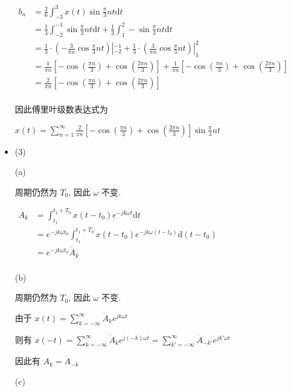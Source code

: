 \documentclass[a4paper,UTF8]{article}
\numberwithin{equation}{section}
\begin{document}
\begin{framed}
\begin{spacing}{1.5}
\begin{itemize}
      $
      \begin{aligned}
      b_n & = \frac{2}{6}\int_{-3}^{3}x(t)\sin \frac{\pi}{3}nt \mathrm{d}t  \\
      & = \frac{1}{3}\int_{-2}^{-1}\sin \frac{\pi}{3}nt \mathrm{d}t + \frac{1}{3}\int_{1}^{2}-\sin \frac{\pi}{3}nt \mathrm{d}t  \\
      & = \frac{1}{3}\cdot (-\frac{3}{\pi n}\cos \frac{\pi}{3}nt)|_{-2}^{-1} + \frac{1}{3}\cdot (\frac{3}{\pi n}\cos \frac{\pi}{3}nt)|_{1}^{2}  \\
      & = \frac{1}{\pi n}[- \cos{(\frac{\pi n}{3})} + \cos{(\frac{2 \pi n}{3})}] + \frac{1}{\pi n}[- \cos{(\frac{\pi n}{3})} + \cos{(\frac{2 \pi n}{3})}]  \\
      & = \frac{2}{\pi n}[- \cos{(\frac{\pi n}{3})} + \cos{(\frac{2 \pi n}{3})}]  \\
      \end{aligned}
      $
      
      因此傅里叶级数表达式为
      
      $\displaystyle x(t) = \sum_{n=1}^{\infty}\frac{2}{\pi n}[- \cos{(\frac{\pi n}{3})} + \cos{(\frac{2 \pi n}{3})}]\sin \frac{\pi}{3}n t$
      
      \item (3)
      
      (a)
      
      周期仍然为 $T_0$, 因此 $\omega$ 不变.
      
      $
      \begin{aligned}
      A_k & = \int_{t_1}^{t_1+T_0}x(t-t_0)e^{-jk\omega t}\mathrm{d}t  \\
      & = e^{-jk\omega t_0}\int_{t_1}^{t_1+T_0}x(t-t_0)e^{-jk\omega (t - t_0)}\mathrm{d}(t-t_0)  \\
      & = e^{-jk\omega t_0}\dot{A}_k  \\
      \end{aligned}
      $
      
      (b)
      
      周期仍然为 $T_0$, 因此 $\omega$ 不变.
      
      由于 $\displaystyle x(t) = \sum_{k=-\infty}^{\infty}\dot{A}_k e^{jk\omega t}$
      
      则有 $\displaystyle x(-t) = \sum_{k=-\infty}^{\infty}\dot{A}_k e^{j(-k)\omega t} = \sum_{k'=-\infty}^{\infty}\dot{A}_{-k'} e^{jk'\omega t}$
      
      因此有 $A_k = \dot{A}_{-k}$
      
      (c)
      

\end{itemize}
\end{spacing}
\end{framed}
\end{document}
